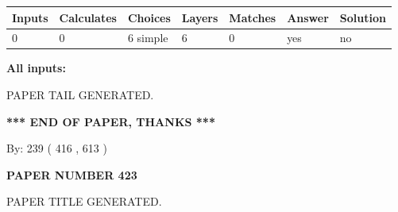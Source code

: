 \documentclass[12pt]{article}
\begin{document}
   
   
   
\noindent\begin{tabular}{|l|l|l|l|l|l|l|}
 \hline
Inputs & Calculates & Choices & Layers & Matches & Answer & Solution \\ \hline
 0  & 
 0  & 
 6
  simple  
  & 
 6  & 
 0  & 
  yes & 
  no 
  \\ \hline
 \end{tabular}
   
   
   
   
\noindent{}
   
   
   
   
\noindent\vspace{0.1in}\hspace{-0.08in} {\textbf{\Large{All inputs: }}}
   
   
   
   
   
   
 \vspace{0.2in}
 
   
   
\vspace{2.0in} PAPER TAIL GENERATED.
   
   
   
   
\vspace{1.0in} 
{\textbf{\large{ *** END OF PAPER, THANKS *** }}} 
   
   
\hspace{1.0in} By: 
 239 ( 416 ,  613 )
   
   
   
   
\newpage 
\setcounter{page}{ 
   423001 } 
   
   
   
   
 {\textbf{ \Large{ PAPER NUMBER  423  }}}
   
   
\vspace{0.2in}
   
   
   
   
   
   
   
   
 \vspace{0.2in}
 
 
 
 
   
   
 PAPER TITLE GENERATED.
   
   
   
\end{document}
